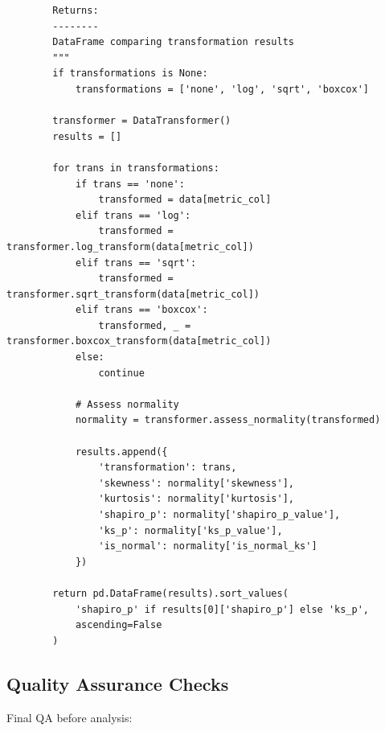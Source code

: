 \begin{lstlisting}
        Returns:
        --------
        DataFrame comparing transformation results
        """
        if transformations is None:
            transformations = ['none', 'log', 'sqrt', 'boxcox']

        transformer = DataTransformer()
        results = []

        for trans in transformations:
            if trans == 'none':
                transformed = data[metric_col]
            elif trans == 'log':
                transformed = transformer.log_transform(data[metric_col])
            elif trans == 'sqrt':
                transformed = transformer.sqrt_transform(data[metric_col])
            elif trans == 'boxcox':
                transformed, _ = transformer.boxcox_transform(data[metric_col])
            else:
                continue

            # Assess normality
            normality = transformer.assess_normality(transformed)

            results.append({
                'transformation': trans,
                'skewness': normality['skewness'],
                'kurtosis': normality['kurtosis'],
                'shapiro_p': normality['shapiro_p_value'],
                'ks_p': normality['ks_p_value'],
                'is_normal': normality['is_normal_ks']
            })

        return pd.DataFrame(results).sort_values(
            'shapiro_p' if results[0]['shapiro_p'] else 'ks_p',
            ascending=False
        )
\end{lstlisting}

\subsection{Quality Assurance Checks}

Final QA before analysis:

